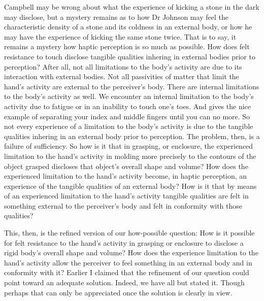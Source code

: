 Campbell may be wrong about what the experience of kicking a stone in the dark may disclose, but a mystery remains as to how Dr Johnson may feel the characteristic density of a stone and its coldness in an external body, or how he may have the experience of kicking the same stone twice. That is to say, it remains a mystery how haptic perception is so much as possible. How does felt resistance to touch disclose tangible qualities inhering in external bodies prior to perception? After all, not all limitations to the body's activity are due to its interaction with external bodies. Not all passivities of matter that limit the hand's activity are external to the perceiver's body. There are internal limitations to the body's activity as well. We encounter an internal limitation to the body's activity due to fatigue or in an inability to touch one's toes. And \citet[154]{Smith:2002sa} gives the nice example of separating your index and middle fingers until you can no more. So not every experience of a limitation to the body's activity is due to the tangible qualities inhering in an external body prior to perception. The problem, then, is a failure of sufficiency. So how is it that in grasping, or enclosure, the experienced limitation to the hand's activity in molding more precisely to the contours of the object grasped  discloses that object's overall shape and volume? How does the experienced limitation to the hand's activity become, in haptic perception, an experience of the tangible qualities of an external body? How is it that by means of an experienced limitation to the hand's activity tangible qualities are felt in something external to the perceiver's body and felt in conformity with those qualities?


This, then, is the refined version of our how-possible question: How is it possible for felt resistance to the hand's activity in grasping or enclosure to disclose a rigid body's overall shape and volume? How does the experience limitation to the hand's activity allow the perceiver to feel something in an external body and in conformity with it? Earlier I claimed that the refinement of our question could point toward an adequate solution. Indeed, we have all but stated it. Though perhaps that can only be appreciated once the solution is clearly in view.


